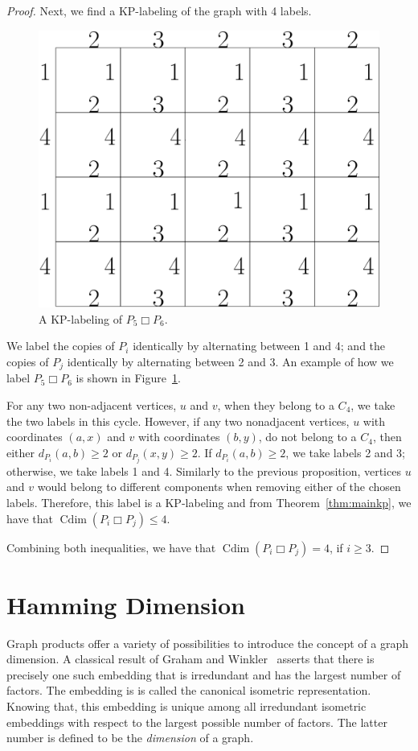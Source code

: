 \documentclass[12pt,a4paper,titlepage,openany]{report}
\DeclareMathOperator{\Cdim}{Cdim}
\begin{document}
\begin{proof}
Next, we find a KP-labeling of the graph with 4 labels.

\begin{figure}[h]
\begin{center}
\includegraphics[width=0.6\linewidth]{figures/p_isqp_j.png}
\end{center}
\caption{A KP-labeling of $P_5 \Box P_6$.}\label{fig:P_5sqP_6}
\end{figure}

We label the copies of $P_i$ identically by alternating between 1 and 4; and the copies of $P_j$ identically by alternating between 2 and 3. An example of how we label $P_5 \Box P_6$ is shown in Figure~\ref{fig:P_5sqP_6}.

For any two non-adjacent vertices, $u$ and $v$, when they belong to a $C_4$, we take the two labels in this cycle. However, if any two nonadjacent vertices, $u$ with coordinates $(a,x)$ and $v$ with coordinates $(b,y)$, do not belong to a $C_4$, then either $d_{P_i}(a,b) \geq 2$ or $d_{P_j}(x,y) \ge 2$. If $d_{P_i}(a,b) \geq 2$, we take labels 2 and 3; otherwise, we take labels 1 and 4. Similarly to the previous proposition, vertices $u$ and $v$ would belong to different components when removing either of the chosen labels. Therefore, this label is a KP-labeling and from Theorem~\ref{thm:mainkp}, we have that $\Cdim(P_i \Box P_j)\leq 4$.

Combining both inequalities, we have that $\Cdim(P_i \Box P_j)=4$, if $i\geq 3$.
\end{proof}

\chapter{Hamming Dimension}\label{hdim-chapter}

Graph products offer a variety of possibilities to introduce the concept of a graph dimension. A classical result of Graham and Winkler~\cite{Graham} asserts that there is precisely one such embedding that is irredundant and has the largest number of factors. The embedding is is called the canonical isometric representation. Knowing that, this embedding is unique among all irredundant isometric embeddings with respect to the largest possible number of factors. The latter number is defined to be the \emph{dimension} of a graph.
\end{document}
